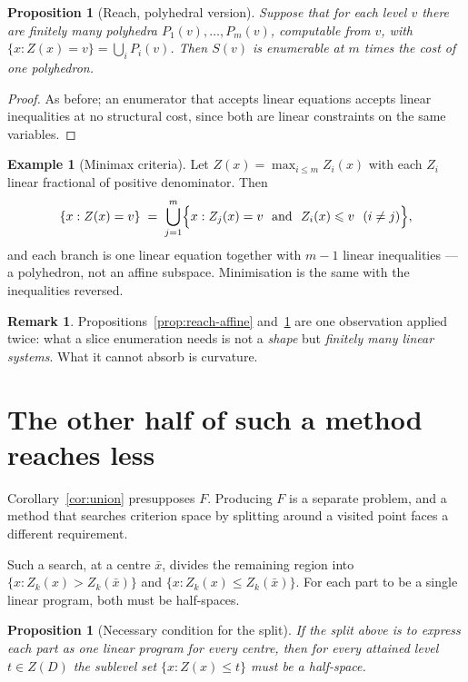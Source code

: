\documentclass[11pt,a4paper]{article}
\newcommand{\Dset}{D}
\newcommand{\Z}{Z}
\theoremstyle{plain}
\newtheorem{proposition}[theorem]{Proposition}
\theoremstyle{definition}
\newtheorem{remark}[theorem]{Remark}
\newtheorem{example}[theorem]{Example}
\begin{document}
\begin{proposition}[Reach, polyhedral version]\label{prop:reach-poly}
Suppose that for each level $v$ there are finitely many polyhedra
$P_1(v),\dots,P_m(v)$, computable from $v$, with
$\{x : \Z(x) = v\} = \bigcup_i P_i(v)$.  Then $S(v)$ is enumerable at $m$ times
the cost of one polyhedron.
\end{proposition}

\begin{proof}
As before; an enumerator that accepts linear equations accepts linear
inequalities at no structural cost, since both are linear constraints on the
same variables.
\end{proof}

\begin{example}[Minimax criteria]\label{ex:max}
Let $\Z(x) = \max_{i \leqslant m} \Z_i(x)$ with each $\Z_i$ linear fractional
of positive denominator.  Then
\[
  \{x : \Z(x) = v\} \;=\; \bigcup_{j=1}^{m}
  \Bigl\{ x : \Z_j(x) = v \ \text{ and } \ \Z_i(x) \leqslant v
  \ \ (i \neq j) \Bigr\} ,
\]
and each branch is one linear equation together with $m-1$ linear inequalities
--- a polyhedron, not an affine subspace.  Minimisation is the same with the
inequalities reversed.
\end{example}

\begin{remark}
Propositions~\ref{prop:reach-affine} and~\ref{prop:reach-poly} are one
observation applied twice: what a slice enumeration needs is not a \emph{shape}
but \emph{finitely many linear systems}.  What it cannot absorb is curvature.
\end{remark}

\section{The other half of such a method reaches less}

Corollary~\ref{cor:union} presupposes $F$.  Producing $F$ is a separate
problem, and a method that searches criterion space by splitting around a
visited point faces a different requirement.

Such a search, at a centre $\bar x$, divides the remaining region into
$\{x : \Z_k(x) > \Z_k(\bar x)\}$ and $\{x : \Z_k(x) \leqslant \Z_k(\bar x)\}$.
For each part to be a single linear program, both must be half-spaces.

\begin{proposition}[Necessary condition for the split]\label{prop:front}
If the split above is to express each part as one linear program for every
centre, then for every \emph{attained} level $t \in \Z(\Dset)$ the sublevel set
$\{x : \Z(x) \leqslant t\}$ must be a half-space.
\end{proposition}
\end{document}
